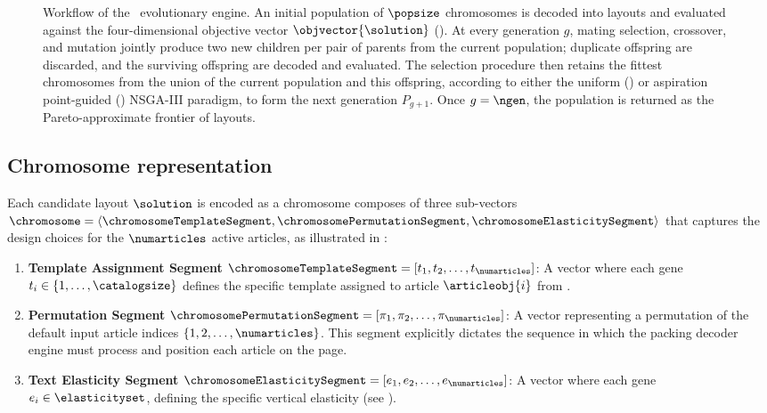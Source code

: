 \begin{figure}[htbp]
\begin{tikzpicture}
    \end{tikzpicture}
    \caption{Workflow of the \methodNameGeneral\ evolutionary engine. An initial population of $\popsize$ chromosomes is decoded into layouts and evaluated against the four-dimensional objective vector $\objvector{\solution}$ (). At every generation $g$, mating selection, crossover, and mutation jointly produce two new children per pair of parents from the current population; duplicate offspring are discarded, and the surviving offspring are decoded and evaluated. The selection procedure then retains the fittest chromosomes from the union of the current population and this offspring, according to either the uniform (\methodNameUniform) or aspiration point-guided (\methodName) NSGA-III paradigm, to form the next generation $P_{g+1}$. Once $g = \ngen$, the population is returned as the Pareto-approximate frontier of layouts.}
    \label{fig:evolutionary_loop}
\end{figure}

\subsection{Chromosome representation}
\label{sec:chromosome_representation}

Each candidate layout $\solution$ is encoded as a chromosome composes of three sub-vectors $\chromosome = \langle \chromosomeTemplateSegment, \chromosomePermutationSegment, \chromosomeElasticitySegment \rangle$ that captures the  design choices for the $\numarticles$ active articles, as illustrated in :

\begin{enumerate}
    \item \textbf{Template Assignment Segment} $\chromosomeTemplateSegment = [t_1, t_2, \dots, t_{\numarticles}]$: A vector where each gene $t_i \in \{1, \dots, \catalogsize\}$ defines the specific template assigned to article $\articleobj{i}$ from \templatecatalog.
    \item \textbf{Permutation Segment} $\chromosomePermutationSegment = [\pi_1, \pi_2, \dots, \pi_{\numarticles}]$: A vector representing a permutation of the default input article indices $\{1, 2, \dots, \numarticles\}$. This segment explicitly dictates the sequence in which the packing decoder engine must process and position each article on the page.
    \item \textbf{Text Elasticity Segment} $\chromosomeElasticitySegment = [e_1, e_2, \dots, e_{\numarticles}]$: A vector where each gene $e_i \in \elasticityset$, defining the specific vertical elasticity (see ).
\end{enumerate}


